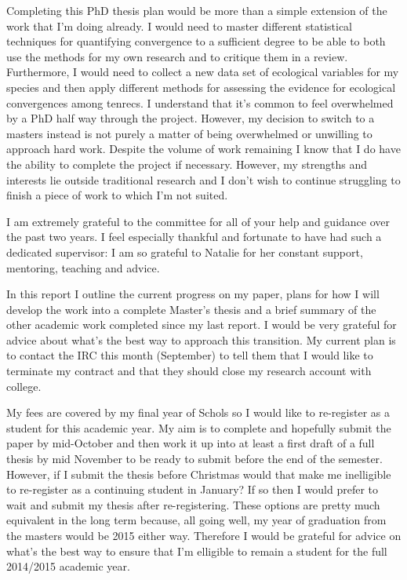 \documentclass[12pt,a4paper]{article}
\begin{document}
Completing this PhD thesis plan would be more than a simple extension of the work that I'm doing already. I would need to master different statistical techniques for quantifying convergence to a sufficient degree to be able to both use the methods for my own research and to critique them in a review. Furthermore, I would need to collect a new data set of ecological variables for my species and then apply different methods for assessing the evidence for ecological convergences among tenrecs.
I understand that it's common to feel overwhelmed by a PhD half way through the project. However, my decision to switch to a masters instead is not purely a matter of being overwhelmed or unwilling to approach hard work. Despite the volume of work remaining I know that I do have the ability to complete the project if necessary. However, my strengths and interests lie outside traditional research and I don't wish to continue struggling to finish a piece of work to which I'm not suited.

I am extremely grateful to the committee for all of your help and guidance over the past two years. I feel especially thankful and fortunate to have had such a dedicated supervisor: I am so grateful to Natalie for her constant support, mentoring, teaching and advice.   

In this report I outline the current progress on my paper, plans for how I will develop the work into a complete Master's thesis and a brief summary of the other academic work completed since my last report. I would be very grateful for advice about what's the best way to approach this transition. My current plan is to contact the IRC this month (September) to tell them that I would like to terminate my contract and that they should close my research account with college.
 
My fees are covered by my final year of Schols so I would like to re-register as a student for this academic year. My aim is to complete and hopefully submit the paper by mid-October and then work it up into at least a first draft of a full thesis by mid November to be ready to submit before the end of the semester. However, if I submit the thesis before Christmas would that make me inelligible to re-register as a continuing student in January? If so then I would prefer to wait and submit my thesis after re-registering. These options are pretty much equivalent in the long term because, all going well, my year of graduation from the masters would be 2015 either way. Therefore I would be grateful for advice on what's the best way to ensure that I'm elligible to remain a student for the full 2014/2015 academic year.
\end{document}
